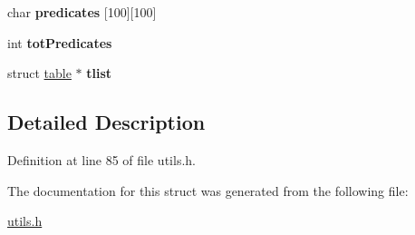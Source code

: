 \begin{DoxyCompactItemize}
\item 
\hypertarget{structconfiguration_a799045d3ce8cc7937c56cfcdf002de05}{
char {\bfseries predicates} \mbox{[}100\mbox{]}\mbox{[}100\mbox{]}}
\label{structconfiguration_a799045d3ce8cc7937c56cfcdf002de05}

\item 
\hypertarget{structconfiguration_aa40e820b5651e19f04bd253872f07d9d}{
int {\bfseries totPredicates}}
\label{structconfiguration_aa40e820b5651e19f04bd253872f07d9d}

\item 
\hypertarget{structconfiguration_ac3b3aa25a20014bf01bf30ece8847627}{
struct \hyperlink{structtable}{table} $\ast$ {\bfseries tlist}}
\label{structconfiguration_ac3b3aa25a20014bf01bf30ece8847627}

\end{DoxyCompactItemize}


\subsection{Detailed Description}


Definition at line 85 of file utils.h.



The documentation for this struct was generated from the following file:\begin{DoxyCompactItemize}
\item 
\hyperlink{utils_8h}{utils.h}\end{DoxyCompactItemize}
